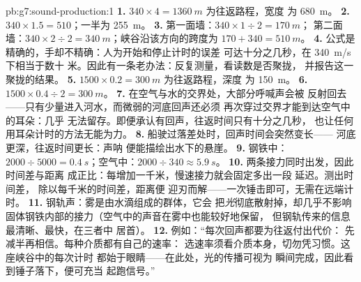 \begin{solution}{pb:g7:sound-production:1}
\textbf{1.} $340 \times 4 = \qty{1360}{m}$ 为往返路程，宽度
为 \qty{680}{m}。
\textbf{2.} $340 \times 1.5 = 510$；一半为 \qty{255}{m}。
\textbf{3.} 第一面墙：$340 \times 1 \div 2 = \qty{170}{m}$；
第二面墙：$340 \times 2 \div 2 = \qty{340}{m}$；峡谷沿该方向的跨度为
$170 + 340 = \qty{510}{m}$。
\textbf{4.} 公式是精确的，手却不精确：人为开始和停止计时的误差
可达十分之几秒，在 \qty{340}{m/s} 下相当于数十
米。因此有一条老办法：反复测量，看读数是否聚拢，
并报告这一聚拢的结果。
\textbf{5.} $1500 \times 0.2 = \qty{300}{m}$ 为往返路程，深度
为 \qty{150}{m}。
\textbf{6.} $1500 \times 0.4 \div 2 = \qty{300}{m}$。
\textbf{7.} 在空气与水的交界处，大部分呼喊声会被
反射回去——只有少量进入河水，而微弱的河底回声还必须
再次穿过交界才能到达空气中的耳朵：几乎
无法留存。即便承认有回声，往返时间只有十分之几秒，
也让任何用耳朵计时的方法无能为力。
\textbf{8.} 船驶过落差处时，回声时间会突然变长——
河底更深，往返时间更长：声呐
便能描绘出水下的悬崖。
\textbf{9.} 钢铁中：$2000 \div 5000 = \qty{0.4}{s}$；空气中：$2000
\div 340 \approx \qty{5.9}{s}$。
\textbf{10.} 两条接力同时出发，因此时间差与距离
成正比：每增加一千米，慢速接力就会固定多出一段
延迟。测出时间差，
除以每千米的时间差，距离便
迎刃而解——一次锤击即可，无需在远端计时。
\textbf{11.} 钢轨声：雾是由水滴组成的群体，它会
把\emph{光}彻底散射掉，却几乎不影响
固体钢铁内部的接力（空气中的声音在雾中也能较好地保留，
但钢轨传来的信息最清晰、最快，在三者中
居首）。
\textbf{12.} 例如：“每次回声都要为往返付出代价：
先减半再相信。每种介质都有自己的速率：
选速率须看介质本身，切勿凭习惯。这座峡谷中的每次计时
都始于眼睛——在此处，光的传播可视为
瞬间完成，因此看到锤子落下，便可充当
起跑信号。”
\end{solution}
